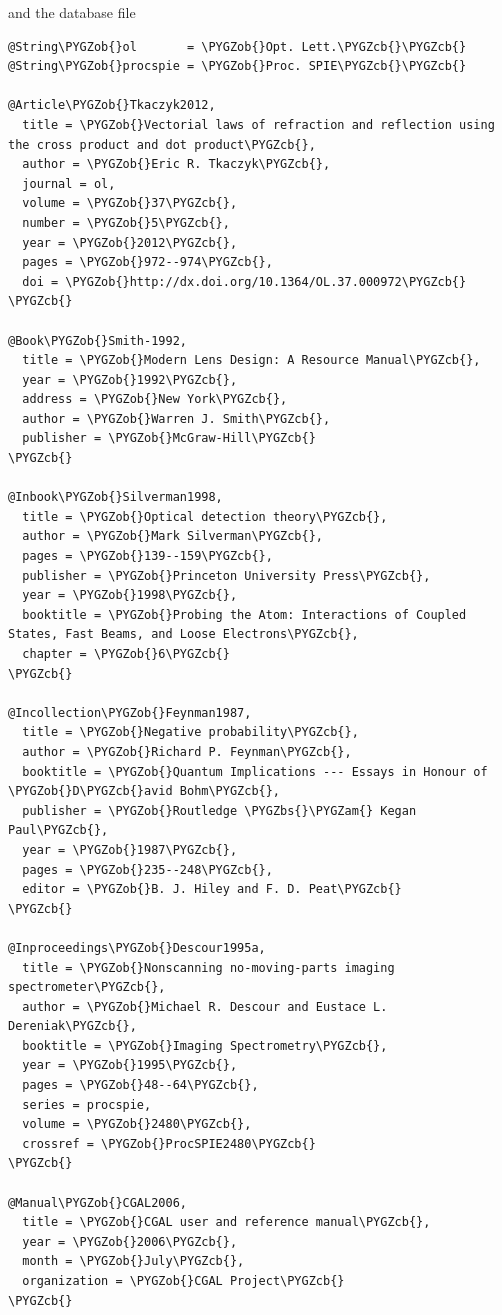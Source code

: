 \documentclass[letterpaper,10pt,english]{sphinxmanual}
\def\PYGZbs{\char`\\}
\def\PYGZob{\char`\{}
\def\PYGZcb{\char`\}}
\def\PYGZam{\char`\&}
\begin{document}
and the database file

\begin{Verbatim}[commandchars=\\\{\}]
@String\PYGZob{}ol       = \PYGZob{}Opt. Lett.\PYGZcb{}\PYGZcb{}
@String\PYGZob{}procspie = \PYGZob{}Proc. SPIE\PYGZcb{}\PYGZcb{}

@Article\PYGZob{}Tkaczyk2012,
  title = \PYGZob{}Vectorial laws of refraction and reflection using the cross product and dot product\PYGZcb{},
  author = \PYGZob{}Eric R. Tkaczyk\PYGZcb{},
  journal = ol,
  volume = \PYGZob{}37\PYGZcb{},
  number = \PYGZob{}5\PYGZcb{},
  year = \PYGZob{}2012\PYGZcb{},
  pages = \PYGZob{}972--974\PYGZcb{},
  doi = \PYGZob{}http://dx.doi.org/10.1364/OL.37.000972\PYGZcb{}
\PYGZcb{}

@Book\PYGZob{}Smith-1992,
  title = \PYGZob{}Modern Lens Design: A Resource Manual\PYGZcb{},
  year = \PYGZob{}1992\PYGZcb{},
  address = \PYGZob{}New York\PYGZcb{},
  author = \PYGZob{}Warren J. Smith\PYGZcb{},
  publisher = \PYGZob{}McGraw-Hill\PYGZcb{}
\PYGZcb{}

@Inbook\PYGZob{}Silverman1998,
  title = \PYGZob{}Optical detection theory\PYGZcb{},
  author = \PYGZob{}Mark Silverman\PYGZcb{},
  pages = \PYGZob{}139--159\PYGZcb{},
  publisher = \PYGZob{}Princeton University Press\PYGZcb{},
  year = \PYGZob{}1998\PYGZcb{},
  booktitle = \PYGZob{}Probing the Atom: Interactions of Coupled States, Fast Beams, and Loose Electrons\PYGZcb{},
  chapter = \PYGZob{}6\PYGZcb{}
\PYGZcb{}

@Incollection\PYGZob{}Feynman1987,
  title = \PYGZob{}Negative probability\PYGZcb{},
  author = \PYGZob{}Richard P. Feynman\PYGZcb{},
  booktitle = \PYGZob{}Quantum Implications --- Essays in Honour of \PYGZob{}D\PYGZcb{}avid Bohm\PYGZcb{},
  publisher = \PYGZob{}Routledge \PYGZbs{}\PYGZam{} Kegan Paul\PYGZcb{},
  year = \PYGZob{}1987\PYGZcb{},
  pages = \PYGZob{}235--248\PYGZcb{},
  editor = \PYGZob{}B. J. Hiley and F. D. Peat\PYGZcb{}
\PYGZcb{}

@Inproceedings\PYGZob{}Descour1995a,
  title = \PYGZob{}Nonscanning no-moving-parts imaging spectrometer\PYGZcb{},
  author = \PYGZob{}Michael R. Descour and Eustace L. Dereniak\PYGZcb{},
  booktitle = \PYGZob{}Imaging Spectrometry\PYGZcb{},
  year = \PYGZob{}1995\PYGZcb{},
  pages = \PYGZob{}48--64\PYGZcb{},
  series = procspie,
  volume = \PYGZob{}2480\PYGZcb{},
  crossref = \PYGZob{}ProcSPIE2480\PYGZcb{}
\PYGZcb{}

@Manual\PYGZob{}CGAL2006,
  title = \PYGZob{}CGAL user and reference manual\PYGZcb{},
  year = \PYGZob{}2006\PYGZcb{},
  month = \PYGZob{}July\PYGZcb{},
  organization = \PYGZob{}CGAL Project\PYGZcb{}
\PYGZcb{}


\end{Verbatim}
\end{document}
